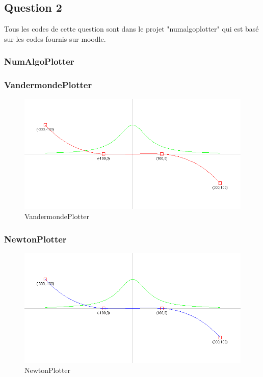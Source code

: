 \subsection{Question 2}

Tous les codes de cette question sont dans le projet "numalgoplotter" qui est basé sur les codes fournis sur moodle. 

\subsubsection{NumAlgoPlotter}


\subsubsection{VandermondePlotter}


\begin{figure}[H]
	\centering
	\caption{\label{vandermonde} VandermondePlotter}
	\includegraphics[scale = 0.4]{6_VandermondePlotter.png}
\end{figure}

\subsubsection{NewtonPlotter}


\begin{figure}[H]
	\centering
	\caption{\label{newton} NewtonPlotter}
	\includegraphics[scale = 0.4]{6_NewtonPlotter.png}
\end{figure}